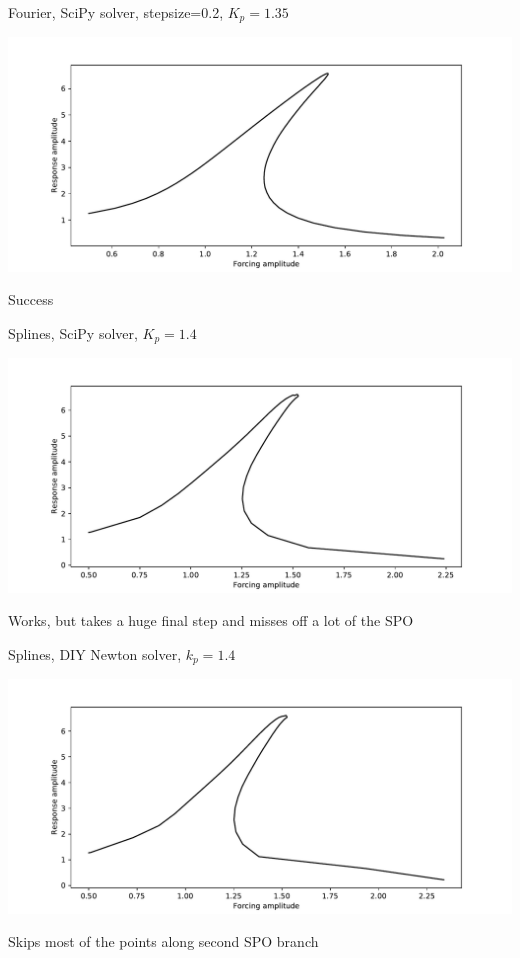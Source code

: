 \documentclass[presentation]{beamer}
\begin{document}
\begin{frame}[label={sec:orgd8b03ff}]{Fourier, SciPy solver, stepsize=0.2, \(K_p=1.35\)}
\begin{center}
\includegraphics[width=.9\linewidth]{./kp1d35_transtime100_scipy_fourier_0d2ss.pdf}
\end{center}

Success
\end{frame}

\begin{frame}[label={sec:org8576fc7}]{Splines, SciPy solver, \(K_p=1.4\)}
\begin{center}
\includegraphics[width=.9\linewidth]{./kp1d4_transtime100_scipy.pdf}
\end{center}

Works, but takes a huge final step and misses off a lot of the SPO
\end{frame}

\begin{frame}[label={sec:org450c46e}]{Splines, DIY Newton solver, \(k_p=1.4\)}
\begin{center}
\includegraphics[width=.9\linewidth]{./kp1d4_transtime100_newton.pdf}
\end{center}

Skips most of the points along second SPO branch
\end{frame}
\end{document}
